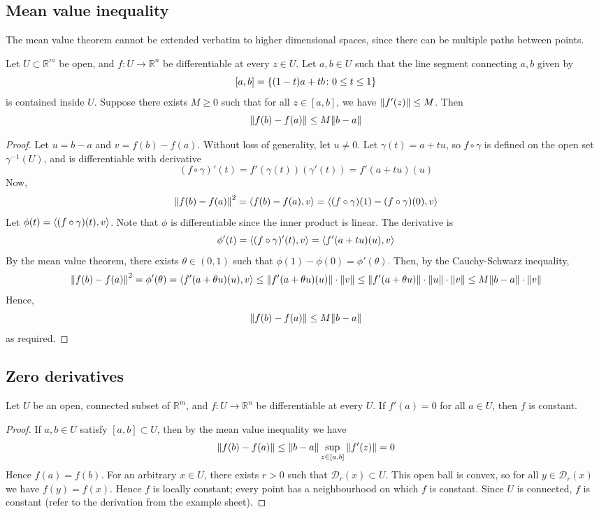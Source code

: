 \subsection{Mean value inequality}
The mean value theorem cannot be extended verbatim to higher dimensional spaces, since there can be multiple paths between points.
\begin{theorem}
	Let \( U \subset \mathbb R^m \) be open, and \( f \colon U \to \mathbb R^n \) be differentiable at every \( z \in U \).
	Let \( a, b \in U \) such that the line segment connecting \( a,b \) given by
	\[
		[a,b] = \qty{(1-t)a + tb \colon 0 \leq t \leq 1}
	\]
	is contained inside \( U \).
	Suppose there exists \( M \geq 0 \) such that for all \( z \in [a,b] \), we have \( \norm{f'(z)} \leq M \).
	Then
	\[
		\norm{f(b) - f(a)} \leq M \norm{b-a}
	\]
\end{theorem}
\begin{proof}
	Let \( u = b - a \) and \( v = f(b) - f(a) \).
	Without loss of generality, let \( u \neq 0 \).
	Let \( \gamma(t) = a + tu \), so \( f \circ \gamma \) is defined on the open set \( \gamma^{-1}(U) \), and is differentiable with derivative
	\[
		(f \circ \gamma)'(t) = f'(\gamma(t))(\gamma'(t)) = f'(a+tu)(u)
	\]
	Now,
	\[
		\norm{f(b) - f(a)}^2 = \left\langle{f(b) - f(a), v}\right\rangle = \left\langle{(f \circ \gamma)(1) - (f \circ \gamma)(0), v}\right\rangle
	\]
	Let \( \phi(t) = \left\langle{(f \circ \gamma)(t), v}\right\rangle \).
	Note that \( \phi \) is differentiable since the inner product is linear.
	The derivative is
	\[
		\phi'(t) = \left\langle{(f \circ \gamma)'(t), v}\right\rangle = \left\langle{f'(a+tu)(u), v}\right\rangle
	\]
	By the mean value theorem, there exists \( \theta \in (0,1) \) such that \( \phi(1) - \phi(0) = \phi'(\theta) \).
	Then, by the Cauchy-Schwarz inequality,
	\[
		\norm{f(b) - f(a)}^2 = \phi'(\theta) = \left\langle{f'(a+\theta u)(u), v}\right\rangle \leq \norm{f'(a+\theta u)(u)} \cdot \norm{v} \leq \norm{f'(a+\theta u)} \cdot \norm{u} \cdot \norm{v} \leq M \norm{b-a} \cdot \norm{v}
	\]
	Hence,
	\[
		\norm{f(b) - f(a)} \leq M \norm{b-a}
	\]
	as required.
\end{proof}

\subsection{Zero derivatives}
\begin{corollary}
	Let \( U \) be an open, connected subset of \( \mathbb R^m \), and \( f \colon U \to \mathbb R^n \) be differentiable at every \( U \).
	If \( f'(a) = 0 \) for all \( a \in U \), then \( f \) is constant.
\end{corollary}
\begin{proof}
	If \( a, b \in U \) satisfy \( [a,b] \subset U \), then by the mean value inequality we have
	\[
		\norm{f(b) - f(a)} \leq \norm{b-a} \sup_{z \in [a,b]} \norm{f'(z)} = 0
	\]
	Hence \( f(a) = f(b) \).
	For an arbitrary \( x \in U \), there exists \( r > 0 \) such that \( \mathcal D_r(x) \subset U \).
	This open ball is convex, so for all \( y \in \mathcal D_r(x) \) we have \( f(y) = f(x) \).
	Hence \( f \) is locally constant; every point has a neighbourhood on which \( f \) is constant.
	Since \( U \) is connected, \( f \) is constant (refer to the derivation from the example sheet).
\end{proof}

